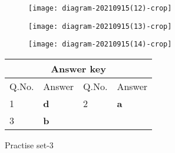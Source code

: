 \begin{enumerate}
\begin{tasks}
\begin{figure}[H]
		\end{figure}
		\task[\textbf{B.}]\begin{figure}[H]
			\centering
			\texttt{[image: diagram-20210915(12)-crop]}
		\end{figure}
		\task[\textbf{C.}]\begin{figure}[H]
			\centering
			\texttt{[image: diagram-20210915(13)-crop]}
		\end{figure}
		\task[\textbf{D.}]\begin{figure}[H]
			\centering
			\texttt{[image: diagram-20210915(14)-crop]}
		\end{figure}
	\end{tasks}
\end{enumerate}
\setlength\arrayrulewidth{1pt}
\begin{table}[H]
	\centering
	
	\begin{tabular}{|p{1.5cm}|p{1.5cm}||p{1.5cm}|p{1.5cm}|}
		\hline
		\multicolumn{4}{|c|}{\textbf{Answer key}}\\\hline\hline
		\rowcolor{ocrel}Q.No.&Answer&Q.No.&Answer\\\hline
		1&\textbf{d}&2&\textbf{a}\\\hline
		3&\textbf{b}&&\\\hline
	\end{tabular}
\end{table}
\newpage
\begin{abox}
	Practise set-3
\end{abox}
